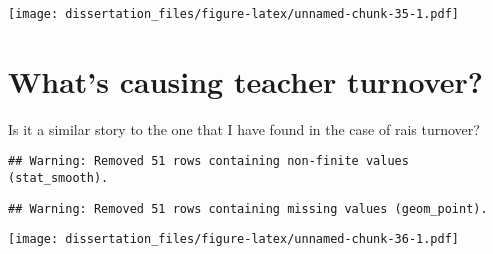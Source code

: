 \documentclass[12pt,]{book}
\newenvironment{Shaded}{\begin{snugshade}}{\end{snugshade}}
\newcommand{\DataTypeTok}[1]{\textcolor[rgb]{0.13,0.29,0.53}{#1}}
\newcommand{\FloatTok}[1]{\textcolor[rgb]{0.00,0.00,0.81}{#1}}
\newcommand{\KeywordTok}[1]{\textcolor[rgb]{0.13,0.29,0.53}{\textbf{#1}}}
\newcommand{\NormalTok}[1]{#1}
\newcommand{\OperatorTok}[1]{\textcolor[rgb]{0.81,0.36,0.00}{\textbf{#1}}}
\newcommand{\StringTok}[1]{\textcolor[rgb]{0.31,0.60,0.02}{#1}}
\begin{document}
\texttt{[image: dissertation\_files/figure-latex/unnamed-chunk-35-1.pdf]}

\hypertarget{whats-causing-teacher-turnover}{%
\section{What's causing teacher turnover?}\label{whats-causing-teacher-turnover}}

Is it a similar story to the one that I have found in the case of rais turnover?

\begin{Shaded}
\end{Shaded}

\begin{verbatim}
## Warning: Removed 51 rows containing non-finite values (stat_smooth).
\end{verbatim}

\begin{verbatim}
## Warning: Removed 51 rows containing missing values (geom_point).
\end{verbatim}

\texttt{[image: dissertation\_files/figure-latex/unnamed-chunk-36-1.pdf]}

\begin{Shaded}
\end{Shaded}
\end{document}
